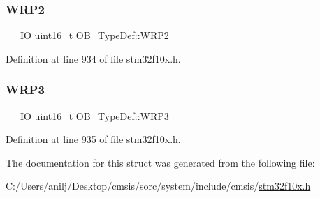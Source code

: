 \subsubsection{\texorpdfstring{W\+R\+P2}{WRP2}}
{\footnotesize\ttfamily \hyperlink{core__sc300_8h_aec43007d9998a0a0e01faede4133d6be}{\+\_\+\+\_\+\+IO} uint16\+\_\+t O\+B\+\_\+\+Type\+Def\+::\+W\+R\+P2}



Definition at line 934 of file stm32f10x.\+h.

\mbox{\label{struct_o_b___type_def_ab8bdaebc42e051ff9911eb88dad75f92}} 
\subsubsection{\texorpdfstring{W\+R\+P3}{WRP3}}
{\footnotesize\ttfamily \hyperlink{core__sc300_8h_aec43007d9998a0a0e01faede4133d6be}{\+\_\+\+\_\+\+IO} uint16\+\_\+t O\+B\+\_\+\+Type\+Def\+::\+W\+R\+P3}



Definition at line 935 of file stm32f10x.\+h.



The documentation for this struct was generated from the following file\+:\begin{DoxyCompactItemize}
\item 
C\+:/\+Users/anilj/\+Desktop/cmsis/sorc/system/include/cmsis/\hyperlink{stm32f10x_8h}{stm32f10x.\+h}\end{DoxyCompactItemize}
